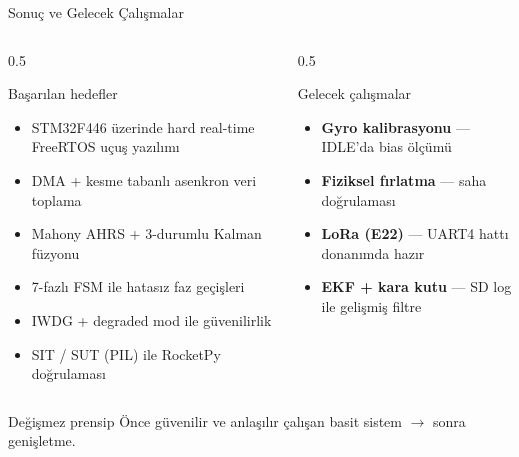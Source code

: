 \begin{frame}{Sonuç ve Gelecek Çalışmalar}
  \begin{columns}[T]
    \begin{column}{0.5\textwidth}
      \begin{exampleblock}{Başarılan hedefler}
        \footnotesize
        \begin{itemize}
          \item STM32F446 üzerinde hard real-time FreeRTOS uçuş yazılımı
          \item DMA + kesme tabanlı asenkron veri toplama
          \item Mahony AHRS + 3-durumlu Kalman füzyonu
          \item 7-fazlı FSM ile hatasız faz geçişleri
          \item IWDG + degraded mod ile güvenilirlik
          \item SIT / SUT (PIL) ile RocketPy doğrulaması
        \end{itemize}
      \end{exampleblock}
    \end{column}
    \begin{column}{0.5\textwidth}
      \begin{block}{Gelecek çalışmalar}
        \footnotesize
        \begin{itemize}
          \item \textbf{Gyro kalibrasyonu} — IDLE'da bias ölçümü
          \item \textbf{Fiziksel fırlatma} — saha doğrulaması
          \item \textbf{LoRa (E22)} — UART4 hattı donanımda hazır
          \item \textbf{EKF + kara kutu} — SD log ile gelişmiş filtre
        \end{itemize}
      \end{block}
    \end{column}
  \end{columns}
  \vspace{4pt}
  \begin{alertblock}{\centering Değişmez prensip}
    \centering\small
    Önce güvenilir ve anlaşılır çalışan basit sistem $\rightarrow$ sonra genişletme.
  \end{alertblock}
\end{frame}
